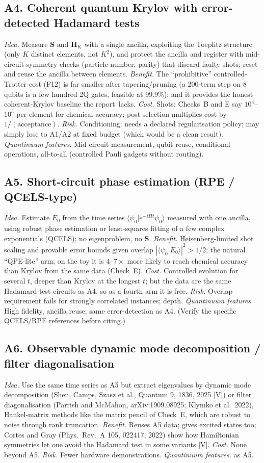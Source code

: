 \documentclass[11pt,a4paper]{article}
\newcommand{\braket}[2]{\langle #1\vert #2\rangle}
\newcommand{\report}{the report}
\newcommand{\lV}{\textcolor{keyblue}{[V]}}   %
\begin{document}
\subsection*{A4. Coherent quantum Krylov with error-detected Hadamard tests}
\emph{Idea.} Measure $\mathbf S$ and $\mathbf H_K$ with a single ancilla, exploiting the Toeplitz structure (only $K$ distinct elements, not $K^2$), and protect the ancilla and register with mid-circuit symmetry checks (particle number, parity) that discard faulty shots; reset and reuse the ancilla between elements. \emph{Benefit.} The ``prohibitive'' controlled-Trotter cost (F12) is far smaller after tapering/pruning (a 200-term step on 8 qubits is a few hundred 2Q gates, feasible at 99.9\%); and it provides the honest coherent-Krylov baseline \report\ lacks. \emph{Cost.} Shots: Checks~B and E say $10^4$--$10^5$ per element for chemical accuracy; post-selection multiplies cost by $1/(\text{acceptance})$. \emph{Risk.} Conditioning: needs a declared regularisation policy; may simply lose to A1/A2 at fixed budget (which would be a clean result). \emph{Quantinuum features.} Mid-circuit measurement, qubit reuse, conditional operations, all-to-all (controlled Pauli gadgets without routing).

\subsection*{A5. Short-circuit phase estimation (RPE / QCELS-type)}
\emph{Idea.} Estimate $E_0$ from the time series $\braket{\psi_0}{e^{-iHt}\psi_0}$ measured with one ancilla, using robust phase estimation or least-squares fitting of a few complex exponentials (QCELS); no eigenproblem, no $\mathbf S$. \emph{Benefit.} Heisenberg-limited shot scaling and provable error bounds given overlap $|\braket{\psi_0}{E_0}|^2>1/2$; the natural ``QPE-lite'' arm; on the toy it is $4$--$7\times$ more likely to reach chemical accuracy than Krylov from the same data (Check~E). \emph{Cost.} Controlled evolution for several $t$, deeper than Krylov at the longest $t$; but the data are the same Hadamard-test circuits as A4, so as a fourth arm it is free. \emph{Risk.} Overlap requirement fails for strongly correlated instances; depth. \emph{Quantinuum features.} High fidelity, ancilla reuse; same error-detection as A4. (Verify the specific QCELS/RPE references before citing.)

\subsection*{A6. Observable dynamic mode decomposition / filter diagonalisation}
\emph{Idea.} Use the same time series as A5 but extract eigenvalues by dynamic mode decomposition (Shen, Camps, Szasz et al., Quantum 9, 1836, 2025 \lV) or filter diagonalisation (Parrish and McMahon, arXiv:1909.08925; Klymko et al.\ 2022), Hankel-matrix methods like the matrix pencil of Check~E, which are robust to noise through rank truncation. \emph{Benefit.} Reuses A5 data; gives excited states too; Cortes and Gray (Phys.\ Rev.\ A 105, 022417, 2022) show how Hamiltonian symmetries let one avoid the Hadamard test in some variants \lV. \emph{Cost.} None beyond A5. \emph{Risk.} Fewer hardware demonstrations. \emph{Quantinuum features.} as A5.
\end{document}

